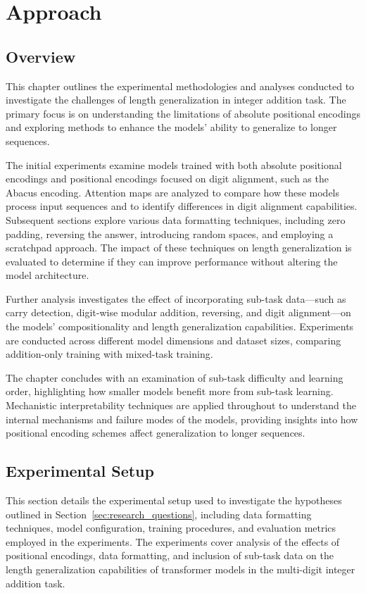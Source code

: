 \chapter{Approach}\label{approach}

\section{Overview}\label{sec:overview}

This chapter outlines the experimental methodologies and analyses conducted to investigate the challenges of length generalization in integer addition task. The primary focus is on understanding the limitations of absolute positional encodings and exploring methods to enhance the models' ability to generalize to longer sequences.

The initial experiments examine models trained with both absolute positional encodings and positional encodings focused on digit alignment, such as the Abacus encoding. Attention maps are analyzed to compare how these models process input sequences and to identify differences in digit alignment capabilities. Subsequent sections explore various data formatting techniques, including zero padding, reversing the answer, introducing random spaces, and employing a scratchpad approach. The impact of these techniques on length generalization is evaluated to determine if they can improve performance without altering the model architecture.

Further analysis investigates the effect of incorporating sub-task data—such as carry detection, digit-wise modular addition, reversing, and digit alignment—on the models' compositionality and length generalization capabilities. Experiments are conducted across different model dimensions and dataset sizes, comparing addition-only training with mixed-task training.

The chapter concludes with an examination of sub-task difficulty and learning order, highlighting how smaller models benefit more from sub-task learning. Mechanistic interpretability techniques are applied throughout to understand the internal mechanisms and failure modes of the models, providing insights into how positional encoding schemes affect generalization to longer sequences.


\section{Experimental Setup}\label{sec:experimental_setup}
This section details the experimental setup used to investigate the hypotheses outlined in Section~\ref{sec:research_questions}, including data formatting techniques, model configuration, training procedures, and evaluation metrics employed in the experiments. The experiments cover analysis of the effects of positional encodings, data formatting, and inclusion of sub-task data on the length generalization capabilities of transformer models in the multi-digit integer addition task.

